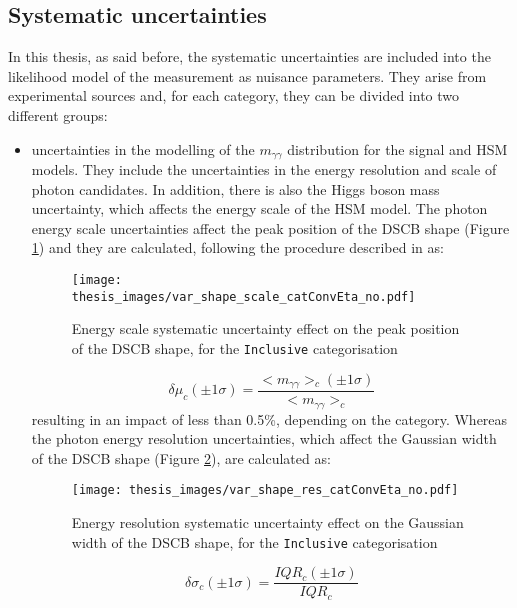 \documentclass[a4paper, oneside, 11pt, openright]{book}
\begin{document}
 			
 			
 			\subsection{Systematic uncertainties}\label{section:syst}
 				In this thesis, as said before, the systematic uncertainties are included into the likelihood model of the measurement as nuisance parameters. They arise from experimental sources and, for each category, they can be divided into two different groups: 
 				\begin{itemize}
 					\item uncertainties in the modelling of the $m_{\gamma\gamma}$ distribution for the signal and HSM models. They include the uncertainties in the energy resolution and scale of photon candidates. In addition, there is also the Higgs boson mass uncertainty, which affects the energy scale of the HSM model. The photon energy scale uncertainties affect the peak position of the DSCB shape (Figure \ref{fig:scale_syst}) and they are calculated, following the procedure described in \cite{Aad_2019} as:
 					\begin{figure}
 						\centering
 						\texttt{[image: thesis\_images/var\_shape\_scale\_catConvEta\_no.pdf]}
 						\caption{Energy scale systematic uncertainty effect on the peak position of the DSCB shape, for the \texttt{Inclusive} categorisation}
 						\label{fig:scale_syst}
 					\end{figure}
 					\begin{equation}\label{eq:shape_syst}
 						\delta\mu_c(\pm1\sigma)=\frac{<m_{\gamma\gamma}>_c(\pm1\sigma)}{<m_{\gamma\gamma}>_c}
 					\end{equation}
 					resulting in an impact of less than 0.5\%, depending on the category. Whereas the photon energy resolution uncertainties, which affect the Gaussian width of the DSCB shape (Figure \ref{fig:res_syst}), are calculated \cite{Aad_2019} as:
 					\begin{figure}
 						\centering
 						\texttt{[image: thesis\_images/var\_shape\_res\_catConvEta\_no.pdf]}
 						\caption{Energy resolution systematic uncertainty effect on the Gaussian width of the DSCB shape, for the \texttt{Inclusive} categorisation}
 						\label{fig:res_syst}
 					\end{figure}
 					\begin{equation}\label{eq:res_syst}
 						\delta\sigma_c(\pm1\sigma)=\frac{IQR_c(\pm1\sigma)}{IQR_c}
 					\end{equation}

\end{itemize}
\end{document}
